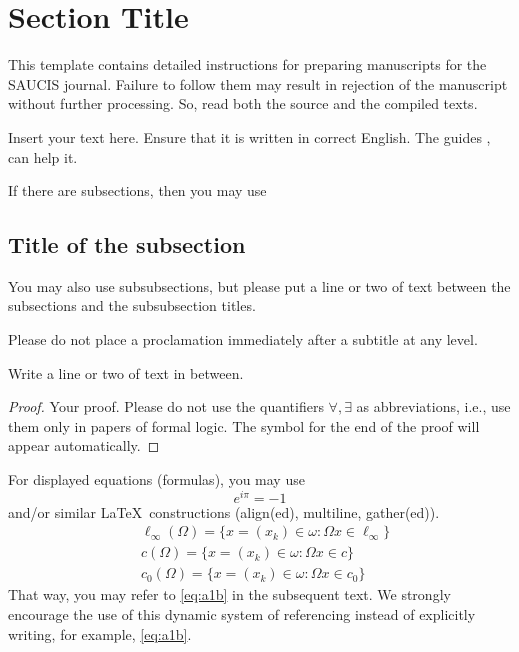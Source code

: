 \documentclass[final, 9pt, onecolumn]{saucis}
\begin{document}
\maketitle



\section{Section Title}  %
This template contains detailed instructions for preparing manuscripts for the SAUCIS journal.
Failure to follow them may result in rejection of the manuscript without further processing.
So, read both the source and the compiled texts.

Insert your text here. Ensure that it is written in correct English. 
The guides \cite{boh, sad}, \cite{gil, kar, tay} can help it.

If there are subsections, then you may use

\subsection{Title of the subsection}
You may also use subsubsections, but please put a line or two of text between the subsections and the subsubsection titles.

Please do not place a proclamation immediately after a subtitle at any level.

Write a line or two of text in between.

\begin{proof}
Your proof.
Please do not use the quantifiers $\forall,\exists$ as abbreviations,
i.e., use them only in papers of formal logic.
The symbol for the end of the proof will appear automatically.
\end{proof}

For displayed equations (formulas), you may use
\begin{equation}\label{eq:a1b}
e^{i\pi}=-1
\end{equation}
and/or similar \LaTeX\ constructions (align(ed), multiline, gather(ed)).
\begin{align*}
&\ell_{\infty}({\Omega})=\Big\{x=(x_{k})\in \omega: \Omega x \in \ell_{\infty}\}\\
&c({\Omega})=\{x=(x_{k})\in \omega: \Omega x \in c\}\\
&c_{0}({\Omega})=\{x=(x_{k})\in \omega: \Omega x \in c_{0}\}
\end{align*}
That way, you may refer to \eqref{eq:a1b} in the subsequent text.
We strongly encourage the use of this dynamic system of referencing
instead of explicitly writing, for example, \eqref{eq:a1b}.
\end{document}
